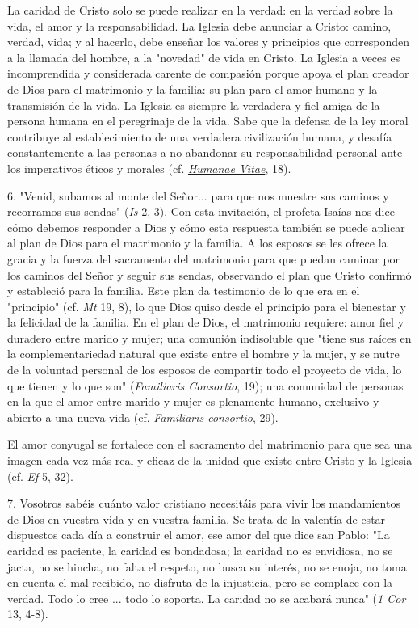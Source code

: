 La caridad de Cristo solo se puede realizar en la verdad: en la verdad
sobre la vida, el amor y la responsabilidad. La Iglesia debe anunciar a
Cristo: camino, verdad, vida; y al hacerlo, debe enseñar los valores y
principios que corresponden a la llamada del hombre, a la "novedad" de
vida en Cristo. La Iglesia a veces es incomprendida y considerada
carente de compasión porque apoya el plan creador de Dios para el
matrimonio y la familia: su plan para el amor humano y la transmisión de
la vida. La Iglesia es siempre la verdadera y fiel amiga de la persona
humana en el peregrinaje de la vida. Sabe que la defensa de la ley moral
contribuye al establecimiento de una verdadera civilización humana, y
desafía constantemente a las personas a no abandonar su responsabilidad
personal ante los imperativos éticos y morales (cf.
\href{http://www.vatican.va/content/paul-vi/it/encyclicals/documents/hf_p-vi_enc_25071968_humanae-vitae.html}{\emph{\emph{Humanae
			Vitae}}}, 18).

6. "Venid, subamos al monte del Señor... para que nos muestre sus
caminos y recorramos sus sendas" (\emph{Is} 2, 3). Con esta invitación,
el profeta Isaías nos dice cómo debemos responder a Dios y cómo esta
respuesta también se puede aplicar al plan de Dios para el matrimonio y
la familia. A los esposos se les ofrece la gracia y la fuerza del
sacramento del matrimonio para que puedan caminar por los caminos del
Señor y seguir sus sendas, observando el plan que Cristo confirmó y
estableció para la familia. Este plan da testimonio de lo que era en el
"principio" (cf. \emph{Mt} 19, 8), lo que Dios quiso desde el principio
para el bienestar y la felicidad de la familia. En el plan de Dios, el
matrimonio requiere: amor fiel y duradero entre marido y mujer; una
comunión indisoluble que "tiene sus raíces en la complementariedad
natural que existe entre el hombre y la mujer, y se nutre de la voluntad
personal de los esposos de compartir todo el proyecto de vida, lo que
tienen y lo que son" (\emph{Familiaris Consortio}, 19); una comunidad de
personas en la que el amor entre marido y mujer es plenamente humano,
exclusivo y abierto a una nueva vida (cf. \emph{Familiaris consortio},
29).

El amor conyugal se fortalece con el sacramento del matrimonio para que
sea una imagen cada vez más real y eficaz de la unidad que existe entre
Cristo y la Iglesia (cf. \emph{Ef} 5, 32).

7. Vosotros sabéis cuánto valor cristiano necesitáis para vivir los
mandamientos de Dios en vuestra vida y en vuestra familia. Se trata de
la valentía de estar dispuestos cada día a construir el amor, ese amor
del que dice san Pablo: "La caridad es paciente, la caridad es
bondadosa; la caridad no es envidiosa, no se jacta, no se hincha, no
falta el respeto, no busca su interés, no se enoja, no toma en cuenta el
mal recibido, no disfruta de la injusticia, pero se complace con la
verdad. Todo lo cree ... todo lo soporta. La caridad no se acabará
nunca" (\emph{1 Cor} 13, 4-8).

